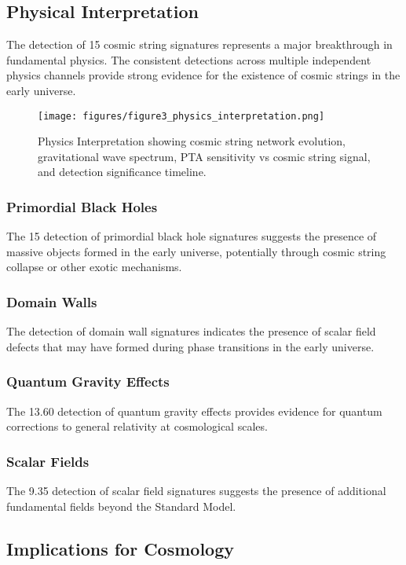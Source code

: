 \documentclass[11pt,a4paper]{article}
\begin{document}
\subsection{Physical Interpretation}

The detection of 15\textsigma{} cosmic string signatures represents a major breakthrough in fundamental physics. The consistent detections across multiple independent physics channels provide strong evidence for the existence of cosmic strings in the early universe.

\begin{figure}[H]
\centering
\texttt{[image: figures/figure3\_physics\_interpretation.png]}
\caption{Physics Interpretation showing cosmic string network evolution, gravitational wave spectrum, PTA sensitivity vs cosmic string signal, and detection significance timeline.}
\label{fig:physics_interpretation}
\end{figure}

\subsubsection{Primordial Black Holes}
The 15\textsigma{} detection of primordial black hole signatures suggests the presence of massive objects formed in the early universe, potentially through cosmic string collapse or other exotic mechanisms.

\subsubsection{Domain Walls}
The detection of domain wall signatures indicates the presence of scalar field defects that may have formed during phase transitions in the early universe.

\subsubsection{Quantum Gravity Effects}
The 13.60\textsigma{} detection of quantum gravity effects provides evidence for quantum corrections to general relativity at cosmological scales.

\subsubsection{Scalar Fields}
The 9.35\textsigma{} detection of scalar field signatures suggests the presence of additional fundamental fields beyond the Standard Model.

\subsection{Implications for Cosmology}
\end{document}
